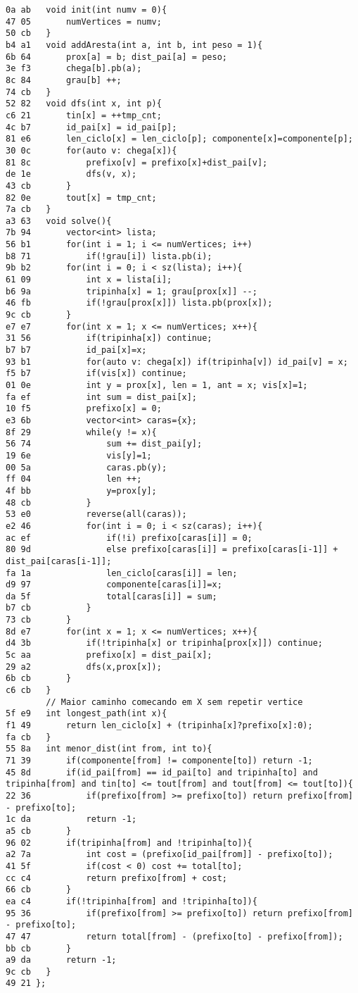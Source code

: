 \documentclass[11pt, a4paper, twoside]{article}
\begin{document}
\begin{lstlisting}
0a ab 	void init(int numv = 0){
47 05 		numVertices = numv;
50 cb 	}
b4 a1 	void addAresta(int a, int b, int peso = 1){
6b 64 		prox[a] = b; dist_pai[a] = peso;
3e f3 		chega[b].pb(a);
8c 84 		grau[b] ++;
74 cb 	}
52 82 	void dfs(int x, int p){
c6 21 		tin[x] = ++tmp_cnt;
4c b7 		id_pai[x] = id_pai[p];
81 e6 		len_ciclo[x] = len_ciclo[p]; componente[x]=componente[p];
30 0c 		for(auto v: chega[x]){
81 8c 			prefixo[v] = prefixo[x]+dist_pai[v];
de 1e 			dfs(v, x);
43 cb 		}
82 0e 		tout[x] = tmp_cnt;
7a cb 	}
a3 63 	void solve(){
7b 94 		vector<int> lista;
56 b1 		for(int i = 1; i <= numVertices; i++)
b8 71 			if(!grau[i]) lista.pb(i);
9b b2 		for(int i = 0; i < sz(lista); i++){
61 09 			int x = lista[i];
b6 9a 			tripinha[x] = 1; grau[prox[x]] --;
46 fb 			if(!grau[prox[x]]) lista.pb(prox[x]);
9c cb 		}
e7 e7 		for(int x = 1; x <= numVertices; x++){
31 56 			if(tripinha[x]) continue;
b7 b7 			id_pai[x]=x;
93 b1 			for(auto v: chega[x]) if(tripinha[v]) id_pai[v] = x;
f5 b7 			if(vis[x]) continue;
01 0e 			int y = prox[x], len = 1, ant = x; vis[x]=1;
fa ef 			int sum = dist_pai[x];
10 f5 			prefixo[x] = 0;
e3 6b 			vector<int> caras={x};
8f 29 			while(y != x){
56 74 				sum += dist_pai[y];
19 6e 				vis[y]=1;
00 5a 				caras.pb(y);
ff 04 				len ++;
4f bb 				y=prox[y];
48 cb 			}
53 e0 			reverse(all(caras));
e2 46 			for(int i = 0; i < sz(caras); i++){
ac ef 				if(!i) prefixo[caras[i]] = 0;
80 9d 				else prefixo[caras[i]] = prefixo[caras[i-1]] + dist_pai[caras[i-1]];
fa 1a 				len_ciclo[caras[i]] = len;
d9 97 				componente[caras[i]]=x;
da 5f 				total[caras[i]] = sum;
b7 cb 			}
73 cb 		}
8d e7 		for(int x = 1; x <= numVertices; x++){
d4 3b 			if(!tripinha[x] or tripinha[prox[x]]) continue;
5c aa 			prefixo[x] = dist_pai[x];
29 a2 			dfs(x,prox[x]);
6b cb 		}
c6 cb 	}
        // Maior caminho comecando em X sem repetir vertice
5f e9 	int longest_path(int x){
f1 49 		return len_ciclo[x] + (tripinha[x]?prefixo[x]:0);
fa cb 	}
55 8a 	int menor_dist(int from, int to){
71 39 		if(componente[from] != componente[to]) return -1;
45 8d 		if(id_pai[from] == id_pai[to] and tripinha[to] and tripinha[from] and tin[to] <= tout[from] and tout[from] <= tout[to]){
22 36 			if(prefixo[from] >= prefixo[to]) return prefixo[from] - prefixo[to];
1c da 			return -1;
a5 cb 		}
96 02 		if(tripinha[from] and !tripinha[to]){
a2 7a 			int cost = (prefixo[id_pai[from]] - prefixo[to]);
41 5f 			if(cost < 0) cost += total[to];
cc c4 			return prefixo[from] + cost;
66 cb 		}
ea c4 		if(!tripinha[from] and !tripinha[to]){
95 36 			if(prefixo[from] >= prefixo[to]) return prefixo[from] - prefixo[to];
47 47 			return total[from] - (prefixo[to] - prefixo[from]);
bb cb 		}
a9 da 		return -1;
9c cb 	}
49 21 };
\end{lstlisting}
\end{document}
